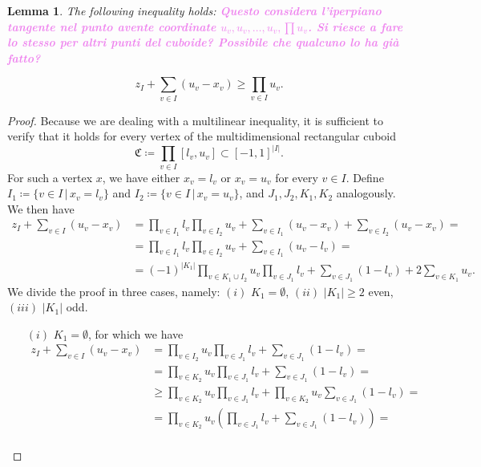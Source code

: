 \documentclass{article}
\newtheorem{lemma}[theorem]{Lemma}
\begin{document}
	\begin{lemma}
		The following inequality holds:
		\textcolor{violet}{\textbf{Questo considera l'iperpiano tangente nel punto avente coordinate \(u_v, u_v, \ldots, u_v, \prod u_v\). Si riesce a fare lo stesso per altri punti del cuboide? Possibile che qualcuno lo ha già fatto?}}

		\begin{equation}
			z_I + \sum_{v \in I} (u_v - x_v) \geq \prod_{v \in I} u_v. \label{eq:ineq-lb}
		\end{equation}
	\end{lemma}
	\begin{proof}
		Because we are dealing with a multilinear inequality, it is sufficient to verify that it holds for every vertex of the multidimensional rectangular cuboid
		\begin{equation*}
			\mathfrak{C} \coloneqq \prod_{v \in I} [l_v, u_v] \subset [-1, 1]^{|I|}.
		\end{equation*} For such a vertex \(x\), we have either \(x_v = l_v\) or \(x_v = u_v\) for every \(v \in I\). Define \(I_1 \coloneqq \{v \in I \, | \, x_v = l_v\}\) and \(I_2 \coloneqq \{v \in I \, | \, x_v = u_v\}\), and \(J_1, J_2, K_1, K_2\) analogously. We then have
		\begin{align*}
			z_I + \sum_{v \in I} (u_v - x_v) & = \prod_{v \in I_1} l_v \prod_{v \in I_2} u_v+ \sum_{v \in I_1} (u_v - x_v) + \sum_{v \in I_2} (u_v - x_v) = \\
			& =  \prod_{v \in I_1} l_v \prod_{v \in I_2} u_v+ \sum_{v \in I_1} (u_v - l_v)= \\
			& =   (-1)^{|K_1|}\prod_{v \in K_1 \cup I_2}u_v \prod_{v \in J_1} l_v+ \sum_{v \in J_1} (1 - l_v) + 2\sum_{v \in K_1}u_v.
		\end{align*}
		We divide the proof in three cases, namely: \((i)\) \(K_1 = \emptyset \), \((ii)\) \(|K_1| \geq 2\) even, \((iii)\) \(|K_1| \) odd.
		\begin{itemize}
			\item[\((i)\)] \(K_1 = \emptyset \), for which we have
			\begin{align*}
				z_I + \sum_{v \in I} (u_v - x_v) & = \prod_{v \in I_2}u_v \prod_{v \in J_1} l_v+ \sum_{v \in J_1} (1 - l_v) =\\
				&= \prod_{v \in K_2}u_v \prod_{v \in J_1} l_v+ \sum_{v \in J_1} (1 - l_v) =\\
				& \geq \prod_{v \in K_2}u_v \prod_{v \in J_1} l_v+ \prod_{v \in K_2}u_v\sum_{v \in J_1} (1 - l_v) = \\
				&= \prod_{v \in K_2}u_v (\prod_{v \in J_1} l_v+ \sum_{v \in J_1} (1 - l_v)) = \\

\end{align*}
\end{itemize}
\end{proof}
\end{document}
